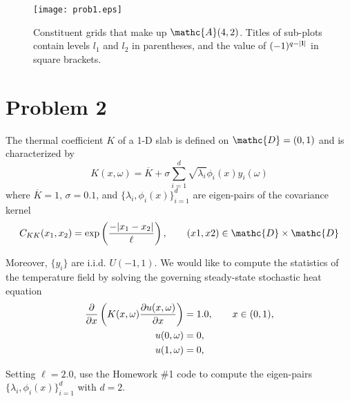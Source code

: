 \documentclass[11pt]{article}
\begin{document}
\begin{figure}[h]
\centering
\texttt{[image: prob1.eps]}
\caption{Constituent grids that make up $\mathc{A}(4,2)$. Titles of sub-plots contain levels $l_1$ and $l_2$ in parentheses, and the value of $(-1)^{q-|\mb{l}|}$ in square brackets.}
\label{fig:prob1}
\end{figure}



\section*{Problem 2} %

The thermal coefficient $K$ of a 1-D slab is defined on $\mathc{D} = (0,1)$ and is characterized by
\begin{equation}
K(x,\omega) = \overline{K} + \sigma \sum_{i=1}^d \sqrt{\lambda_i} \phi_i(x) y_i(\omega)
\end{equation}
where $\overline{K}=1$, $\sigma=0.1$, and $\{ \lambda_i, \phi_i(x) \}_{i=1}^d$ are eigen-pairs of the covariance kernel
\begin{equation}
C_{KK}(x_1,x_2) = \exp \left( \frac{- | x_1-x_2 | }{\ell} \right), \qquad (x1,x2) \in \mathc{D} \times \mathc{D}
\end{equation}

Moreover, $\{y_i\}$ are i.i.d. $U(-1,1)$. We would like to compute the statistics of the temperature field by solving the governing steady-state stochastic heat equation
\begin{equation}
\begin{aligned}
\frac{\partial}{\partial x} \left( K(x,\omega) \frac{\partial u(x,\omega)}{\partial x} \right) &= 1.0, \qquad x \in (0,1), \\
u(0,\omega) &= 0, \\
u(1,\omega) &= 0,
\end{aligned}
\label{eq:pde}
\end{equation}

Setting $\ell = 2.0$, use the Homework \#1 code to compute the eigen-pairs $\{ \lambda_i, \phi_i(x) \}_{i=1}^d$ with $d=2$.
\end{document}
